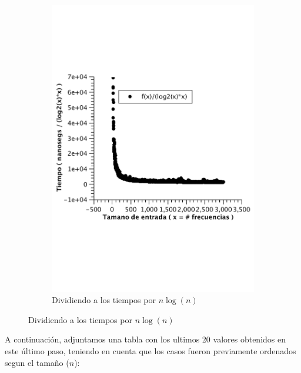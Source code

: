 \begin{figure}[H]
        \centering
        \begin{subfigure}[b]{0.5\textwidth}
                \includegraphics[width=\textwidth]{imagenes/af-wc-const.pdf}
                \caption*{Dividiendo a los tiempos por $n \log(n)$}
        \end{subfigure}
\end{figure}

A continuación, adjuntamos una tabla con los ultimos 20 valores obtenidos en este último paso, teniendo en cuenta que los casos fueron previamente ordenados segun el tamaño ($n$):

